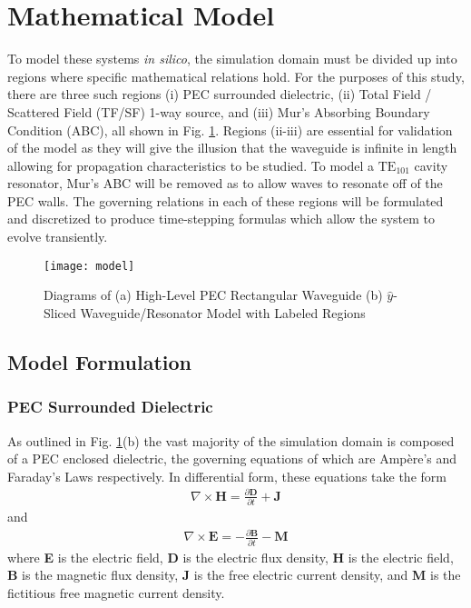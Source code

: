 \section{Mathematical Model}
\label{sec:mathmod}

To model these systems \textit{in silico}, the simulation domain must be divided up into regions where specific mathematical relations hold. For the purposes of this study, there are three such regions (i) PEC surrounded dielectric, (ii) Total Field / Scattered Field (TF/SF) 1-way source, and (iii) Mur's Absorbing Boundary Condition (ABC), all shown in Fig. \ref{fig:model}. Regions (ii-iii) are essential for validation of the model as they will give the illusion that the waveguide is infinite in length allowing for propagation characteristics to be studied. To model a $\mathrm{TE_{101}}$ cavity resonator, Mur's ABC will be removed as to allow waves to resonate off of the PEC walls. The governing relations in each of these regions will be formulated and discretized to produce time-stepping formulas which allow the system to evolve transiently.

\begin{figure}[h!]  
	\centering
	\texttt{[image: model]} 
	\caption{Diagrams of (a) High-Level PEC Rectangular Waveguide (b) $\hat{y}$-Sliced Waveguide/Resonator Model with Labeled Regions}
	\label{fig:model}
\end{figure}

\subsection{Model Formulation}
\label{subsec:model-formulation}

\subsubsection{PEC Surrounded Dielectric}
\label{subsec:dielectric-formulation}

As outlined in Fig. \ref{fig:model}(b) the vast majority of the simulation domain is composed of a PEC enclosed dielectric, the governing equations of which are Amp\`{e}re's and Faraday's Laws respectively. In differential form, these equations take the form 
\begin{align}
    \nabla\times\textbf{H} = \frac{\partial\textbf{D}}{\partial t} + \textbf{J}
    \label{eq:ampere}
\end{align}
and 
\begin{align}
    \nabla\times\textbf{E}=-\frac{\partial\textbf{B}}{\partial t} - \textbf{M}
    \label{eq:faraday}
\end{align}
where \textbf{E} is the electric field, \textbf{D} is the electric flux density, \textbf{H} is the electric field, \textbf{B} is the magnetic flux density, \textbf{J} is the free electric current density, and \textbf{M} is the fictitious free magnetic current density.

